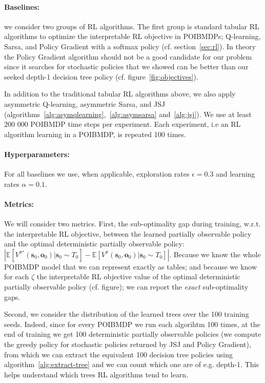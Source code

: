 \paragraph{Baselines:} we consider two groups of RL algorithms.
The first group is standard tabular RL algorithms to optimize the interpretable RL objective in POIBMDPs; Q-learning, Sarsa, and Policy Gradient with a softmax policy (cf. section~\ref{sec:rl}).
In theory the Policy Gradient algorithm should not be a good candidate for our problem since it searches for stochastic policies that we showed can be better than our seeked depth-1 decision tree policy (cf. figure~\ref{fig:objectives}).

In addition to the traditional tabular RL algorithms above, we also apply asymmetric Q-learning, asymmetric Sarsa, and JSJ (algorithms~\ref{alg:asymqlearning},~\ref{alg:asymsarsa} and~\ref{alg:jsj}).
We use at least 200 000 POIBMDP time steps per experiment. Each experiment, i.e an RL algorithm learning in a POIBMDP, is repeated 100 times.  

\paragraph{Hyperparameters:} For all baselines we use, when applicable, exploration rates $\epsilon=0.3$ and learning rates $\alpha=0.1$.

\paragraph{Metrics:} We will consider two metrics.
First, the sub-optimality gap during training, w.r.t. the interpretable RL objective, between the learned partially observable policy and the optimal deterministic partially observable policy: $|\mathbb{E}\left[V^\pi^{\star}(\boldsymbol{s}_0,\boldsymbol{o}_0)| \boldsymbol{s}_0\sim T_0\right] - \mathbb{E}\left[V^\pi(\boldsymbol{s}_0,\boldsymbol{o}_0)|\boldsymbol{s}_0\sim T_0\right]|$.
Because we know the whole POIBMDP model that we can represent exactly as tables; and because we know for each $\zeta$ the interpretable RL objective value of the optimal deterministic partially observable policy (cf. figure); we can report the \textit{exact} sub-optimality gaps.

Second, we consider the distribution of the learned trees over the 100 training seeds.
Indeed, since for every POIBMDP we run each algorihtm 100 times, at the end of training we get 100 deterministic partially observable policies (we compute the greedy policy for stochastic policies returned by JSJ and Policy Gradient), from which we can extract the equivalent 100 decision tree policies using algorithm~\ref{alg:extract-tree} and we can count which one are of e.g. depth-1.
This helps understand which trees RL algorithms tend to learn.

